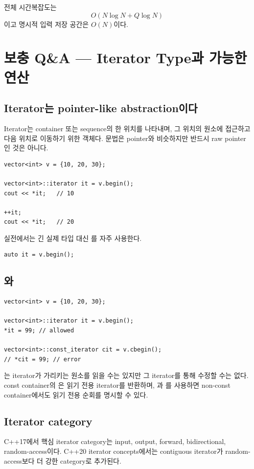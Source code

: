 전체 시간복잡도는
\[
O(N\log N+Q\log N)
\]
이고 명시적 입력 저장 공간은 $O(N)$이다.


\section{보충 Q\&A --- Iterator Type과 가능한 연산}

\subsection{Iterator는 pointer-like abstraction이다}
Iterator는 container 또는 sequence의 한 위치를 나타내며, 그 위치의 원소에 접근하고 다음 위치로 이동하기 위한 객체다. 문법은 pointer와 비슷하지만 반드시 raw pointer인 것은 아니다.

\begin{lstlisting}
vector<int> v = {10, 20, 30};

vector<int>::iterator it = v.begin();
cout << *it;   // 10

++it;
cout << *it;   // 20
\end{lstlisting}

실전에서는 긴 실제 타입 대신 를 자주 사용한다.

\begin{lstlisting}
auto it = v.begin();
\end{lstlisting}

\subsection{와 }

\begin{lstlisting}
vector<int> v = {10, 20, 30};

vector<int>::iterator it = v.begin();
*it = 99; // allowed

vector<int>::const_iterator cit = v.cbegin();
// *cit = 99; // error
\end{lstlisting}

는 iterator가 가리키는 원소를 읽을 수는 있지만 그 iterator를 통해 수정할 수는 없다. const container의 은 읽기 전용 iterator를 반환하며, 과 를 사용하면 non-const container에서도 읽기 전용 순회를 명시할 수 있다.

\subsection{Iterator category}
C++17에서 핵심 iterator category는 input, output, forward, bidirectional, random-access이다. C++20 iterator concepts에서는 contiguous iterator가 random-access보다 더 강한 category로 추가된다.

